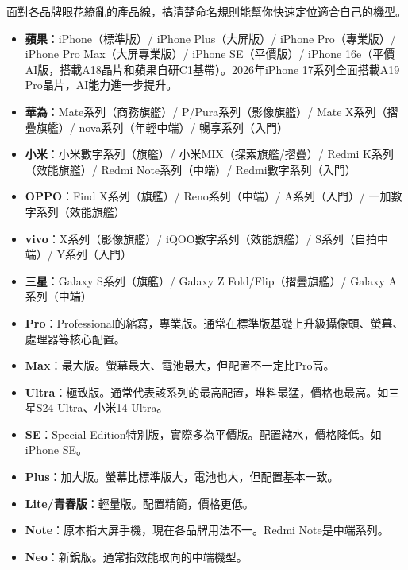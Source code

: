 
面對各品牌眼花繚亂的產品線，搞清楚命名規則能幫你快速定位適合自己的機型。


\begin{itemize}
  \item \textbf{蘋果}：iPhone（標準版）/ iPhone Plus（大屏版）/ iPhone Pro（專業版）/ iPhone Pro Max（大屏專業版）/ iPhone SE（平價版）/ iPhone 16e（平價AI版，搭載A18晶片和蘋果自研C1基帶）。2026年iPhone 17系列全面搭載A19 Pro晶片，AI能力進一步提升。
  \item \textbf{華為}：Mate系列（商務旗艦）/ P/Pura系列（影像旗艦）/ Mate X系列（摺疊旗艦）/ nova系列（年輕中端）/ 暢享系列（入門）
  \item \textbf{小米}：小米數字系列（旗艦）/ 小米MIX（探索旗艦/摺疊）/ Redmi K系列（效能旗艦）/ Redmi Note系列（中端）/ Redmi數字系列（入門）
  \item \textbf{OPPO}：Find X系列（旗艦）/ Reno系列（中端）/ A系列（入門）/ 一加數字系列（效能旗艦）
  \item \textbf{vivo}：X系列（影像旗艦）/ iQOO數字系列（效能旗艦）/ S系列（自拍中端）/ Y系列（入門）
  \item \textbf{三星}：Galaxy S系列（旗艦）/ Galaxy Z Fold/Flip（摺疊旗艦）/ Galaxy A系列（中端）
\end{itemize}


\begin{itemize}
  \item \textbf{Pro}：Professional的縮寫，專業版。通常在標準版基礎上升級攝像頭、螢幕、處理器等核心配置。
  \item \textbf{Max}：最大版。螢幕最大、電池最大，但配置不一定比Pro高。
  \item \textbf{Ultra}：極致版。通常代表該系列的最高配置，堆料最猛，價格也最高。如三星S24 Ultra、小米14 Ultra。
  \item \textbf{SE}：Special Edition特別版，實際多為平價版。配置縮水，價格降低。如iPhone SE。
  \item \textbf{Plus}：加大版。螢幕比標準版大，電池也大，但配置基本一致。
  \item \textbf{Lite/青春版}：輕量版。配置精簡，價格更低。
  \item \textbf{Note}：原本指大屏手機，現在各品牌用法不一。Redmi Note是中端系列。
  \item \textbf{Neo}：新銳版。通常指效能取向的中端機型。
\end{itemize}

